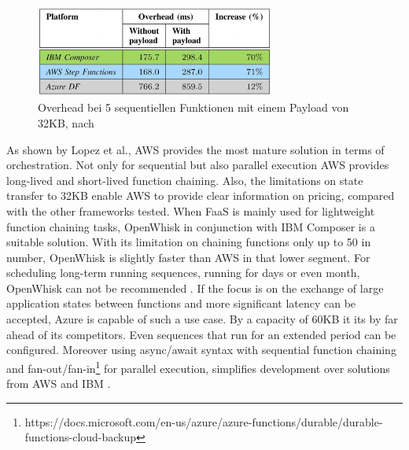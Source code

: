 \documentclass[11pt]{article}
\begin{document}
\begin{figure}[H]
\caption{Overhead bei 5 sequentiellen Funktionen mit einem Payload von 32KB, nach \cite{lopez2018comparison}}
\label{fig:orchestration}
\centering
\includegraphics[width=0.7\textwidth]{Orchestration}
\end{figure} 
As shown by Lopez et al., AWS provides the most mature solution in terms of orchestration. Not only for sequential but also parallel execution AWS provides long-lived and short-lived function chaining. Also, the limitations on state transfer to 32KB enable AWS to provide clear information on pricing, compared with the other frameworks tested. When FaaS is mainly used for lightweight function chaining tasks, OpenWhisk in conjunction with IBM Composer is a suitable solution. With its limitation on chaining functions only up to 50 in number, OpenWhisk is slightly faster than AWS in that lower segment. For scheduling long-term running sequences, running for days or even month, OpenWhisk can not be recommended \cite{lopez2018comparison}. If the focus is on the exchange of large application states between functions and more significant latency can be accepted, Azure is capable of such a use case. By a capacity of 60KB it its by far ahead of its competitors. Even sequences that run for an extended period can be configured. Moreover using async/await syntax with sequential function chaining and fan-out/fan-in\footnote{https://docs.microsoft.com/en-us/azure/azure-functions/durable/durable-functions-cloud-backup} for parallel execution, simplifies development over solutions from AWS and IBM \cite{lopez2018comparison}.
\end{document}
